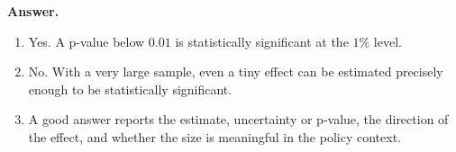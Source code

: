\documentclass[12pt]{article}
\begin{document}
\noindent
\textbf{Answer.}
\begin{enumerate}[label=(\alph*)]
\item Yes. A p-value below $0.01$ is statistically significant at the $1\%$ level.
\item No. With a very large sample, even a tiny effect can be estimated precisely enough to be statistically significant.
\item A good answer reports the estimate, uncertainty or p-value, the direction of the effect, and whether the size is meaningful in the policy context.
\end{enumerate}
\end{document}
